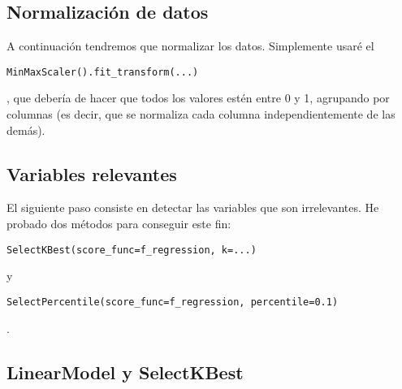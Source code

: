 \documentclass[
12pt, 
spanish, 
singlespacing,
headsepline
]{article}
\newcommand{\code}[1]{\colorbox{light-gray}{\parbox{\dimexpr\linewidth-2\fboxsep}{\strut  \texttt{#1}\strut}}}
\begin{document}
\subsection{Normalización de datos}
A continuación tendremos que normalizar los datos. Simplemente usaré el \code{MinMaxScaler().fit_transform(...)}, que debería de hacer que todos los valores estén entre 0 y 1, agrupando por columnas (es decir, que se normaliza cada columna independientemente de las demás).

\subsection{Variables relevantes}
El siguiente paso consiste en detectar las variables que son irrelevantes. He probado dos métodos para conseguir este fin: \code{SelectKBest(score_func=f_regression, k=...)} y \code{SelectPercentile(score_func=f_regression, percentile=0.1)}.

\subsection{LinearModel y SelectKBest}
\end{document}
